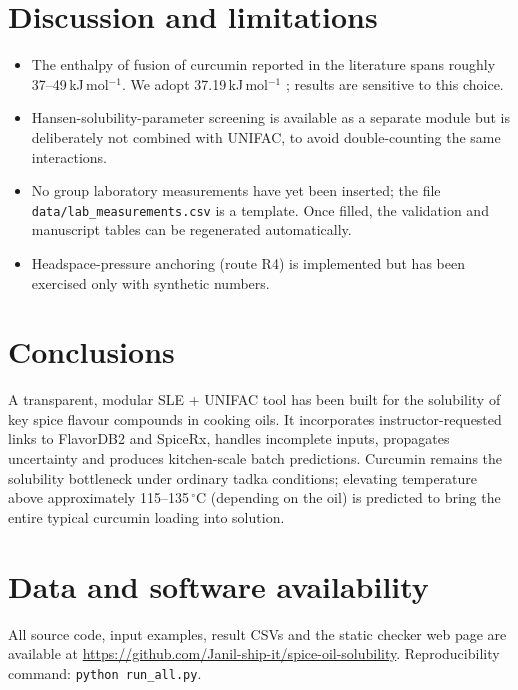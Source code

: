 \documentclass[twocolumn,10pt]{article}
\begin{document}
\section{Discussion and limitations}

\begin{itemize}
\item The enthalpy of fusion of curcumin reported in the literature spans roughly 37--49\,kJ\,mol$^{-1}$. We adopt 37.19\,kJ\,mol$^{-1}$ \citep{ranjbar2024}; results are sensitive to this choice.
\item Hansen-solubility-parameter screening is available as a separate module but is deliberately not combined with UNIFAC, to avoid double-counting the same interactions.
\item No group laboratory measurements have yet been inserted; the file \texttt{data/lab\_measurements.csv} is a template. Once filled, the validation and manuscript tables can be regenerated automatically.
\item Headspace-pressure anchoring (route R4) is implemented but has been exercised only with synthetic numbers.
\end{itemize}

\section{Conclusions}

A transparent, modular SLE + UNIFAC tool has been built for the solubility of key spice flavour compounds in cooking oils. It incorporates instructor-requested links to FlavorDB2 and SpiceRx, handles incomplete inputs, propagates uncertainty and produces kitchen-scale batch predictions. Curcumin remains the solubility bottleneck under ordinary tadka conditions; elevating temperature above approximately 115--135\,$^\circ$C (depending on the oil) is predicted to bring the entire typical curcumin loading into solution.

\section*{Data and software availability}
All source code, input examples, result CSVs and the static checker web page are available at
\url{https://github.com/Janil-ship-it/spice-oil-solubility}.
Reproducibility command: \texttt{python run\_all.py}.
\end{document}
